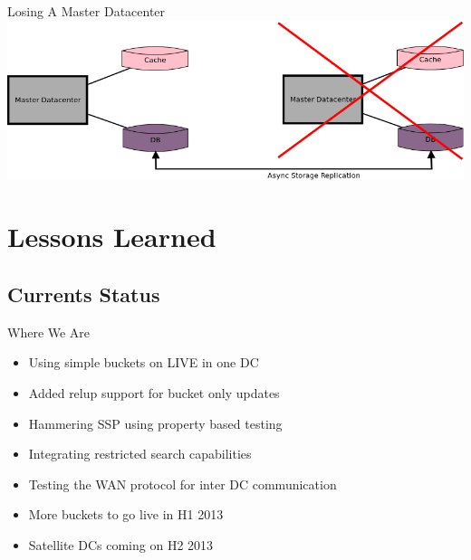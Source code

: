 \documentclass[aspectratio=43]{beamer}
\begin{document}
\begin{frame}{Losing A Master Datacenter}
    \includegraphics[width=\textwidth]{images/lostmasterdchope.png}
\end{frame}

\section{Lessons Learned}

\subsection{Currents Status}
\begin{frame}{Where We Are}
    \begin{itemize}
        \item Using simple buckets on LIVE in one DC
        \item Added relup support for bucket only updates
        \item Hammering SSP using property based testing
        \item Integrating restricted search capabilities
        \item Testing the WAN protocol for inter DC communication
        \item More buckets to go live in H1 2013
        \item Satellite DCs coming on H2 2013
    \end{itemize}
\end{frame}
\end{document}
